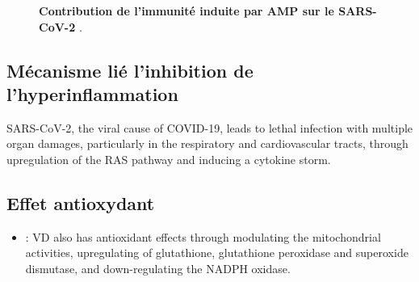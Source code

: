 \documentclass[
  a4paper,
  DIV=11,
  numbers=noendperiod,
  listof=totoc]{scrreprt}
\providecommand{\tightlist}{%
  \setlength{\itemsep}{0pt}\setlength{\parskip}{0pt}}\usepackage{longtable,booktabs,array}
\begin{document}
\begin{figure}


\caption[Contribution de l'immunité induite par AMP sur le
SARS-CoV-2]{\label{fig-vd-amp}\textbf{Contribution de l'immunité induite
par AMP sur le SARS-CoV-2} \autocite{White.2022}.}

\end{figure}%

\subsection{Mécanisme lié l'inhibition de
l'hyperinflammation}\label{muxe9canisme-liuxe9-linhibition-de-lhyperinflammation}

SARS-CoV-2, the viral cause of COVID-19, leads to lethal infection with
multiple organ damages, particularly in the respiratory and
cardiovascular tracts, through upregulation of the RAS pathway and
inducing a cytokine storm.

\subsection{Effet antioxydant}\label{effet-antioxydant}

\begin{itemize}
\tightlist
\item
  \textcite{Shiravi.2022} : VD also has antioxidant effects through
  modulating the mitochondrial activities, upregulating of glutathione,
  glutathione peroxidase and superoxide dismutase, and down-regulating
  the NADPH oxidase.
\end{itemize}
\end{document}
